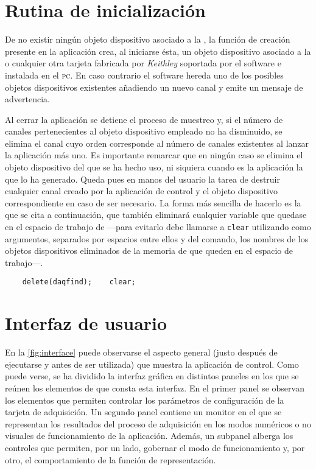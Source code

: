 \section{Rutina de inicialización}

De no existir ningún objeto dispositivo asociado a la \kpci{}, la función
de creación presente en la aplicación crea, al iniciarse ésta, un objeto
dispositivo asociado a la \kpci{} o cualquier otra tarjeta fabricada por
\emph{Keithley} soportada por el software e instalada en el \textsc{pc}. En
caso contrario el software hereda uno de los posibles objetos dispositivos
existentes añadiendo un nuevo canal y emite un mensaje de advertencia.

Al cerrar la aplicación se detiene el proceso de muestreo y, si el número
de canales pertenecientes al objeto dispositivo empleado no ha disminuido,
se elimina el canal cuyo orden corresponde al número de canales existentes
al lanzar la aplicación más uno. Es importante remarcar que en ningún caso
se elimina el objeto dispositivo del que se ha hecho uso, ni siquiera
cuando es la aplicación la que lo ha generado. Queda pues en manos del
usuario la tarea de destruir cualquier canal creado por la aplicación de
control y el objeto dispositivo correspondiente en caso de ser necesario.
La forma más sencilla de hacerlo es la que se cita a continuación, que
también eliminará cualquier variable que quedase en el espacio de trabajo
de \matlab{} ---para evitarlo debe llamarse a \texttt{clear} utilizando
como argumentos, separados por espacios entre ellos y del comando, los
nombres de los objetos dispositivos eliminados de la memoria de \matlab{}
que queden en el espacio de trabajo---.

\begin{lstlisting}
	delete(daqfind);	clear;
\end{lstlisting}


\section{Interfaz de usuario}

En la \vref{fig:interface} puede observarse el aspecto general (justo
después de ejecutarse y antes de ser utilizada) que muestra la aplicación
de control. Como puede verse, se ha dividido la interfaz gráfica en
distintos paneles en los que se reúnen los elementos de que consta esta
interfaz. En el primer panel se observan los elementos que permiten
controlar los parámetros de configuración de la tarjeta de adquisición. Un
segundo panel contiene un monitor en el que se representan los resultados
del proceso de adquisición en los modos numéricos o no visuales de
funcionamiento de la aplicación. Además, un subpanel alberga los controles
que permiten, por un lado, gobernar el modo de funcionamiento y, por otro,
el comportamiento de la función de representación.

